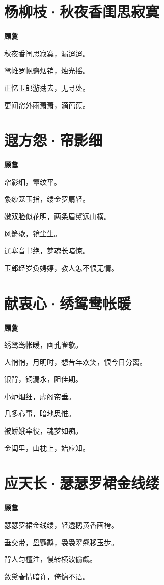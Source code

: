 \documentclass[12pt,a4paper]{ctexbook}
\begin{document}
\section{杨柳枝·秋夜香闺思寂寞}
\textbf{顾敻}\par\vspace{0.5em}
秋夜香闺思寂寞，漏迢迢。\par
鸳帷罗幌麝烟销，烛光摇。\par
正忆玉郎游荡去，无寻处。\par
更闻帘外雨萧萧，滴芭蕉。\par

\section{遐方怨·帘影细}
\textbf{顾敻}\par\vspace{0.5em}
帘影细，簟纹平。\par
象纱笼玉指，缕金罗扇轻。\par
嫩双脸似花明，两条眉黛远山横。\par
风箫歇，镜尘生。\par
辽塞音书绝，梦魂长暗惊。\par
玉郎经岁负娉婷，教人怎不恨无情。\par

\section{献衷心·绣鸳鸯帐暖}
\textbf{顾敻}\par\vspace{0.5em}
绣鸳鸯帐暖，画孔雀欹。\par
人悄悄，月明时，想昔年欢笑，恨今日分离。\par
银背，铜漏永，阻佳期。\par
小炉烟细，虚阁帘垂。\par
几多心事，暗地思惟。\par
被娇娥牵役，魂梦如痴。\par
金闺里，山枕上，始应知。\par

\section{应天长·瑟瑟罗裙金线缕}
\textbf{顾敻}\par\vspace{0.5em}
瑟瑟罗裙金线缕，轻透鹅黄香画袴。\par
垂交带，盘鹦鹉，袅袅翠翘移玉步。\par
背人匀檀注，慢转横波偷觑。\par
敛黛春情暗许，倚慵不语。\par
\end{document}
